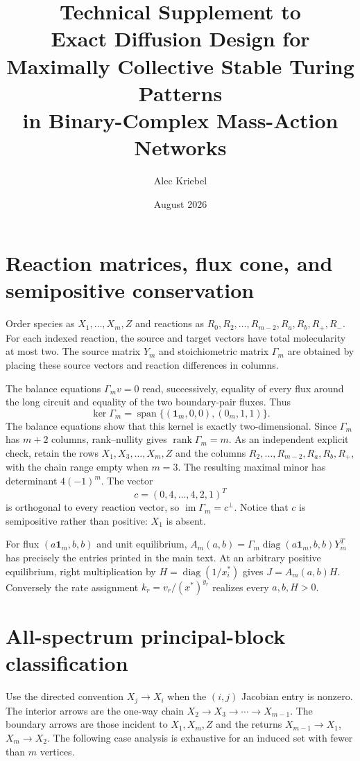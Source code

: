 \documentclass[10pt]{article}
\title{Technical Supplement to\\[0.2em]
\large Exact Diffusion Design for Maximally Collective Stable Turing Patterns\\
\normalsize in Binary-Complex Mass-Action Networks}
\author{Alec Kriebel}
\date{August 2026}
\newif\ifsiadsreview
\newcommand{\diag}{\operatorname{diag}}
\newcommand{\1}{\mathbf1}
\newcommand{\rank}{\operatorname{rank}}
\newcommand{\im}{\operatorname{im}}
\begin{document}
\ifsiadsreview\linenumbers\fi
\maketitle
\tableofcontents

\section{Reaction matrices, flux cone, and semipositive conservation}

Order species as $X_1,\ldots,X_m,Z$ and reactions as
$R_0,R_2,\ldots,R_{m-2},R_a,R_b,R_+,R_-$.  For each indexed reaction, the
source and target vectors have total molecularity at most two.  The source
matrix $Y_m$ and stoichiometric matrix $\Gamma_m$ are obtained by placing
these source vectors and reaction differences in columns.

The balance equations $\Gamma_mv=0$ read, successively, equality of every
flux around the long circuit and equality of the two boundary-pair fluxes.
Thus
\[
 \ker\Gamma_m=
 \operatorname{span}\{(\1_m,0,0),(0_m,1,1)\}.
\]
The balance equations show that this kernel is exactly two-dimensional.
Since $\Gamma_m$ has $m+2$ columns, rank--nullity gives
$\rank\Gamma_m=m$.  As an independent explicit check, retain the rows
$X_1,X_3,\ldots,X_m,Z$ and the columns
$R_2,\ldots,R_{m-2},R_a,R_b,R_+$, with the chain range empty when $m=3$.
The resulting maximal minor has determinant $4(-1)^m$.
The vector
\[
 c=(0,4,\ldots,4,2,1)^T
\]
is orthogonal to every reaction vector, so $\im\Gamma_m=c^\perp$.
Notice that $c$ is semipositive rather than positive: $X_1$ is absent.

For flux $(a\1_m,b,b)$ and unit equilibrium,
$A_m(a,b)=\Gamma_m\diag(a\1_m,b,b)Y_m^T$ has precisely the entries printed in
the main text.  At an arbitrary positive equilibrium, right multiplication by
$H=\diag(1/x_i^*)$ gives $J=A_m(a,b)H$.  Conversely the rate assignment
$k_r=v_r/(x^*)^{y_r}$ realizes every $a,b,H>0$.

\section{All-spectrum principal-block classification}

Use the directed convention $X_j\to X_i$ when the $(i,j)$ Jacobian entry is
nonzero.  The interior arrows are the one-way chain
$X_2\to X_3\to\cdots\to X_{m-1}$.  The boundary arrows are those incident to
$X_1,X_m,Z$ and the returns $X_{m-1}\to X_1$, $X_m\to X_2$.  The following
case analysis is exhaustive for an induced set with fewer than $m$ vertices.
\end{document}
